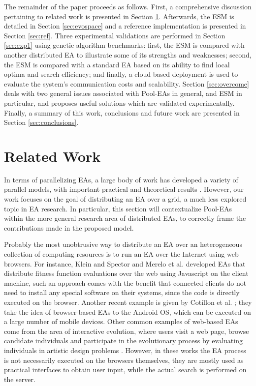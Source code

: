 The remainder of the paper proceeds as follows.
First, a comprehensive discussion pertaining to related work is presented in Section \ref{sec:related}.
Afterwards, the ESM is detailed in Section \ref{sec:evospace} and a reference implementation is presented in Section \ref{sec:ref}.
Three experimental validations are performed in Section \ref{sec:exp1} using genetic algorithm benchmarks:
first, the ESM is compared with another distributed EA to illustrate some of its
strengths and weaknesses; second, the ESM is compared with a standard EA based on its ability to find local optima and search efficiency;
and finally, a cloud based deployment is used to evaluate the system's communication costs and scalability.
Section \ref{sec:overcome} deals with two general issues associated with Pool-EAs in general, and ESM in particular,
and proposes useful solutions which are validated experimentally.
Finally, a summary of this work, conclusions and future work are presented in Section \ref{sec:conclusions}.
 

\section{Related Work}
\label{sec:related}
In terms of parallelizing EAs, a large body of work has developed a variety of parallel models, with
important practical and theoretical results \cite{parallelEA}.
However, our work focuses on the goal of distributing an EA over a grid, a much less explored topic in EA research.
In particular, this section will contextualize Pool-EAs within the more general research area of distributed EAs,
to correctly frame the contributions made in the proposed model.

Probably the most unobtrusive way to distribute an EA over an heterogeneous collection of computing resources is to run an EA over the Internet using web browsers.
For instance, Klein and Spector \cite{spector:2007} and Merelo et al. \cite{merelo:2008} developed EAs that distribute fitness function evaluations over the web using Javascript on the client machine, such an approach comes with the benefit that connected clients do not need to install any special software on their systems,
since the code is directly executed on the browser.
Another recent example is given by Cotillon et al. \cite{cotillon:2012}; they take the idea of browser-based EAs to the Android OS, which can be
executed on a large number of mobile devices.
Other common examples of web-based EAs come from the area of interactive evolution, where users visit a web page, browse candidate individuals
and participate in the evolutionary process by evaluating individuals in artistic design problems \cite{Musart,Fire,langdon:2004,picbreeder}.
However, in these works the EA process is not necessarily executed on the browsers themselves, they are mostly used as practical interfaces
to obtain user input, while the actual search is performed on the server.


